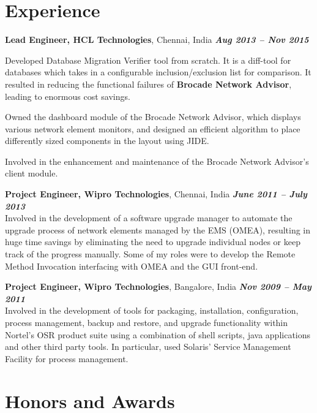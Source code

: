 \documentclass[margin]{resume}
\begin{document}
\begin{resume}
\section{\mysidestyle Experience}
\textbf{Lead Engineer, HCL Technologies}, Chennai, India \hfill \textbf{\textit{Aug 2013 -- Nov 2015}}\\
\vspace{-10pt}
\begin{list2}
\item Developed Database Migration Verifier tool from scratch. It is a
diff-tool for databases which takes in a configurable inclusion/exclusion list
for comparison. It resulted in reducing the functional failures of
\textbf{Brocade Network Advisor}, leading to enormous cost savings.
\item Owned the dashboard module of the Brocade Network Advisor, which displays
various network element monitors, and designed an efficient algorithm to place
differently sized components in the layout using JIDE.
\item Involved in the enhancement and maintenance of the Brocade Network
Advisor's client module.
\end{list2}
	
\textbf{Project Engineer, Wipro Technologies}, Chennai, India \hfill \textbf{\textit{June 2011 -- July 2013}}\\
Involved in the development of a software upgrade manager to automate the
upgrade process of network elements managed by the EMS (OMEA), resulting in
huge time savings by eliminating the need to upgrade individual nodes or keep
track of the progress manually. Some of my roles were to develop the Remote
Method Invocation interfacing with OMEA and the GUI front-end.

\textbf{Project Engineer, Wipro Technologies}, Bangalore, India \hfill \textbf{\textit{Nov 2009 -- May 2011}}\\
Involved in the development of tools for packaging, installation,
configuration, process management, backup and restore, and upgrade
functionality within Nortel's OSR product suite using a combination of shell
scripts, java applications and other third party tools. In particular, used
Solaris' Service Management Facility for process management.

\section{\mysidestyle Honors and Awards}
\begin{list2}


\end{list2}
\end{resume}
\end{document}
